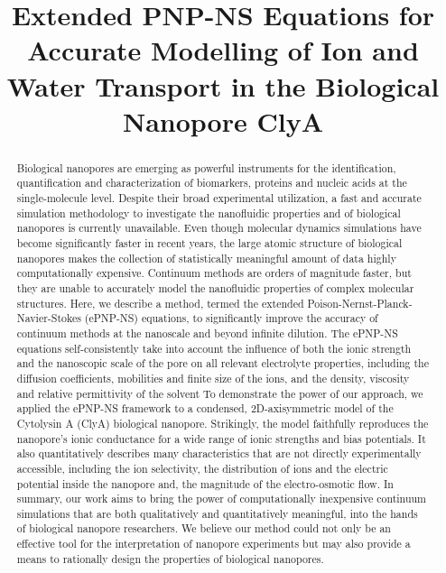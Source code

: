 \documentclass[journal=ancac3,manuscript=article,etalmode=truncate,maxauthors=0,layout=onecolumn]{achemso}
\title{Extended PNP-NS Equations for Accurate Modelling of Ion and Water Transport in the Biological Nanopore ClyA}
\begin{document}
\begin{tocentry}
\end{tocentry}



\begin{abstract}
  \footnotesize
  Biological nanopores are emerging as powerful instruments for the identification, quantification and characterization of biomarkers, proteins and nucleic acids at the single-molecule level. 
  Despite their broad experimental utilization, a fast and accurate simulation methodology to investigate the nanofluidic properties and  of biological nanopores is currently unavailable. Even though molecular dynamics simulations have become significantly faster in recent years, the large atomic structure of biological nanopores makes the collection of statistically meaningful amount of data highly computationally expensive. Continuum methods are orders of magnitude faster, but they are unable to accurately model the nanofluidic properties of complex molecular structures.
  Here, we describe a method, termed the extended Poison-Nernst-Planck-Navier-Stokes (ePNP-NS) equations, to significantly improve the accuracy of continuum methods at the nanoscale and beyond infinite dilution. The ePNP-NS equations self-consistently take into account the influence of both the ionic
  strength and the nanoscopic scale of the pore on all relevant electrolyte properties, including the diffusion coefficients, mobilities and finite size of the ions, and the density, viscosity and relative permittivity of the solvent To demonstrate the power of our approach, we applied the ePNP-NS framework to a condensed, 2D-axisymmetric model of the Cytolysin A (ClyA) biological nanopore. Strikingly, the model faithfully reproduces the nanopore’s ionic conductance for a wide range of ionic strengths and bias potentials. It also quantitatively describes many characteristics that are not directly experimentally accessible, including the ion selectivity, the distribution of ions and the electric potential inside the nanopore and, the magnitude of the electro-osmotic flow.
  In summary, our work aims to bring the power of computationally inexpensive continuum simulations that are both qualitatively and quantitatively meaningful, into the hands of biological nanopore researchers. We believe our method could not only be an effective tool for the interpretation of nanopore experiments but may also provide a means to rationally design the properties of biological nanopores.


\end{abstract}
\end{document}

